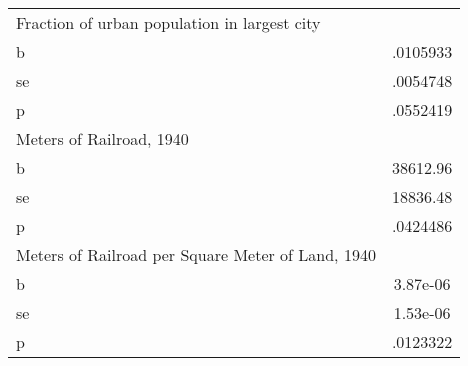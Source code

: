 \begin{tabular}{l*{1}{c}}
\midrule
Fraction of urban population in largest city&         \\
b               & .0105933\\
se              & .0054748\\
p               & .0552419\\
\midrule
Meters of Railroad, 1940&         \\
b               & 38612.96\\
se              & 18836.48\\
p               & .0424486\\
\midrule
Meters of Railroad per Square Meter of Land, 1940&         \\
b               & 3.87e-06\\
se              & 1.53e-06\\
p               & .0123322\\
\bottomrule
\end{tabular}
